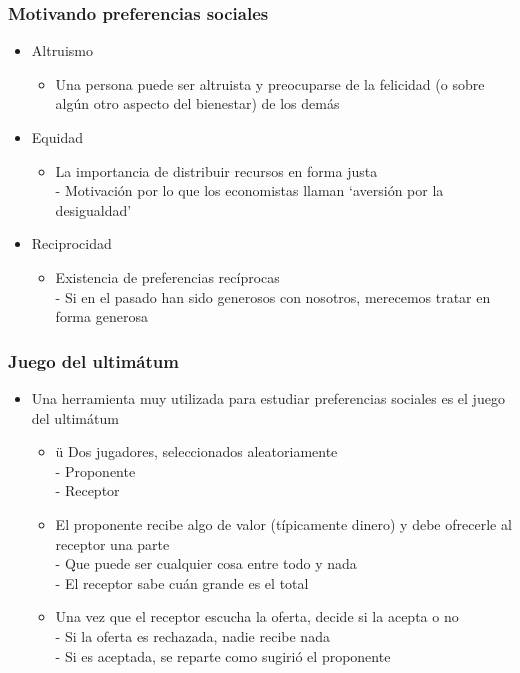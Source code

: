 \documentclass{beamer}
\begin{document}
\begin{frame}
\frametitle{Motivando preferencias sociales}
\begin{itemize}
        \item Altruismo
        \begin{itemize}
            \item Una persona puede ser altruista y preocuparse de la felicidad (o sobre algún otro aspecto del bienestar) de los demás
        \end{itemize}
        \item Equidad
        \begin{itemize}
            \item La importancia de distribuir recursos en forma justa \\
            - Motivación por lo que los economistas llaman `aversión por la desigualdad'
        \end{itemize}
        \item Reciprocidad
        \begin{itemize}
            \item Existencia de preferencias recíprocas \\
            - Si en el pasado han sido generosos con nosotros, merecemos tratar en forma generosa
        \end{itemize}
\end{itemize}
\end{frame}

\begin{frame}
\frametitle{ Juego del ultimátum}
\begin{itemize}
        \item Una herramienta muy utilizada para estudiar preferencias sociales es el juego del ultimátum
        \begin{itemize}
            \item ü Dos jugadores, seleccionados aleatoriamente \\ 
            - Proponente \\
            - Receptor
            \item El proponente recibe algo de valor (típicamente dinero) y debe ofrecerle al receptor una parte \\
            - Que puede ser cualquier cosa entre todo y nada \\
            - El receptor sabe cuán grande es el total
            \item Una vez que el receptor escucha la oferta, decide si la acepta o no \\
            - Si la oferta es rechazada, nadie recibe nada \\
            - Si es aceptada, se reparte como sugirió el proponente
        \end{itemize}
\end{itemize}
\end{frame}
\end{document}
